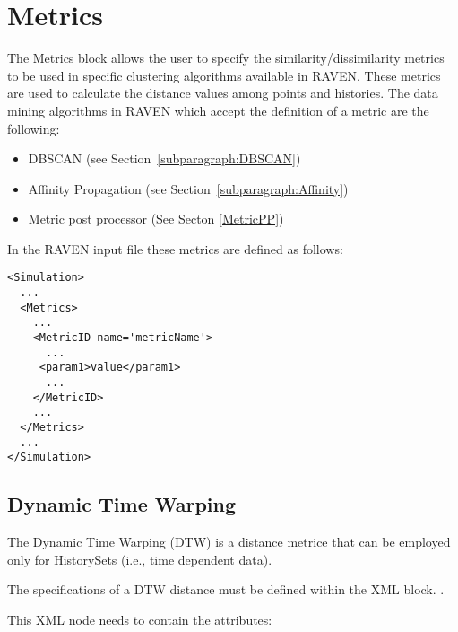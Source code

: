 \section{Metrics}
\label{sec:Metrics}

The Metrics block allows the user to specify the similarity/dissimilarity metrics to be used in specific clustering algorithms available in RAVEN.
These metrics are used to calculate the distance values among points and histories.
The data mining algorithms in RAVEN which accept the definition of a metric are the following:
\begin{itemize}
  \item DBSCAN (see Section~\ref{subparagraph:DBSCAN})
  \item Affinity Propagation (see Section~\ref{subparagraph:Affinity})
  \item Metric post processor (See Secton \ref{MetricPP})
\end{itemize}

In the RAVEN input file these metrics are defined as follows:
\begin{lstlisting}[style=XML]
<Simulation>
  ...
  <Metrics>
    ...
    <MetricID name='metricName'>
      ...
     <param1>value</param1>
      ...
    </MetricID>
    ...
  </Metrics>
  ...
</Simulation>
\end{lstlisting}

\subsection{Dynamic Time Warping}
\label{subsection:DTW}
The Dynamic Time Warping (DTW) is a distance metrice that can be employed only for HistorySets (i.e., time dependent data).

The specifications of a DTW distance must be defined within the XML block.
.

This XML node needs to contain the attributes:


